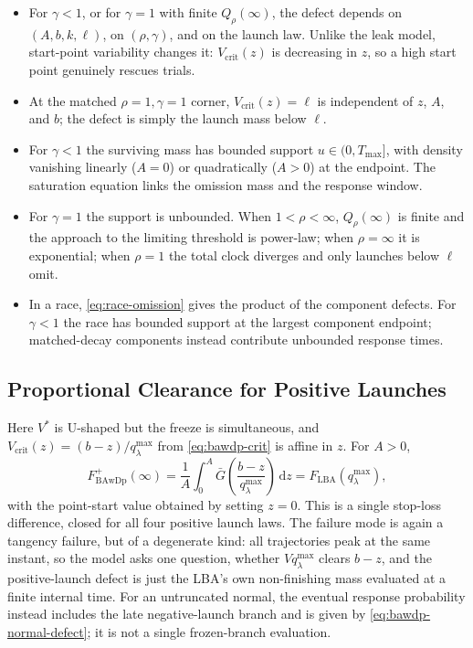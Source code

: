 \documentclass[12pt]{article}
\newcommand{\dd}{\,\mathrm{d}}
\newcommand{\Gbar}{\bar{G}}
\theoremstyle{remark}
\begin{document}
\begin{itemize}
  \item For $\gamma<1$, or for $\gamma=1$ with finite $Q_\rho(\infty)$, the defect depends on $(A,b,k,\ell)$, on $(\rho,\gamma)$, and on the launch law. Unlike the leak model, start-point variability changes it: $V_{\mathrm{crit}}(z)$ is decreasing in $z$, so a high start point genuinely rescues trials.
  \item At the matched $\rho=1,\gamma=1$ corner, $V_{\mathrm{crit}}(z)=\ell$ is independent of $z$, $A$, and $b$; the defect is simply the launch mass below $\ell$.
  \item For $\gamma<1$ the surviving mass has bounded support $u\in(0,T_{\max}]$, with density vanishing linearly ($A=0$) or quadratically ($A>0$) at the endpoint. The saturation equation links the omission mass and the response window.
  \item For $\gamma=1$ the support is unbounded. When $1<\rho<\infty$, $Q_\rho(\infty)$ is finite and the approach to the limiting threshold is power-law; when $\rho=\infty$ it is exponential; when $\rho=1$ the total clock diverges and only launches below $\ell$ omit.
  \item In a race, \eqref{eq:race-omission} gives the product of the component defects. For $\gamma<1$ the race has bounded support at the largest component endpoint; matched-decay components instead contribute unbounded response times.
\end{itemize}

\subsection{Proportional Clearance for Positive Launches}
Here $V^{*}$ is U-shaped but the freeze is simultaneous, and $V_{\mathrm{crit}}(z) = (b-z)/q_{\lambda}^{\max}$ from
\eqref{eq:bawdp-crit} is affine in $z$. For $A>0$,
\begin{equation}
  F_{\mathrm{BAwDp}}^{+}(\infty)
  = \frac{1}{A}\int_0^{A}\Gbar\!\left(
      \frac{b-z}{q_{\lambda}^{\max}}\right)\dd z
  = F_{\mathrm{LBA}}\!\left(q_{\lambda}^{\max}\right),
\end{equation}
with the point-start value obtained by setting $z=0$. This is a single stop-loss difference, closed for all four positive launch laws. The failure mode is again a tangency failure, but of a degenerate kind: all trajectories peak at the same instant, so the model asks one question, whether $Vq_{\lambda}^{\max}$ clears $b-z$, and the positive-launch defect is just the LBA's own non-finishing mass evaluated at a finite internal time. For an untruncated normal, the eventual response probability instead includes the late negative-launch branch and is given by
\eqref{eq:bawdp-normal-defect}; it is not a single frozen-branch evaluation.
\end{document}
